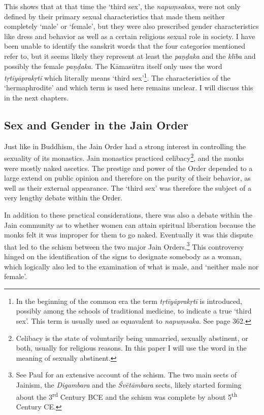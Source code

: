 This shows that at that time the `third sex', the {\em napuṃsakas}, were not only defined by their primary sexual characteristics that made them neither completely `male' or `female', but they were also prescribed gender characteristics like dress and behavior as well as a certain religious sexual role in society. I have been unable to identify the sanskrit words that the four categories mentioned refer to, but it seems likely they represent at least the {\em paṇḍaka} and the {\em klība} and possibly the female {\em paṇḍaka}. The Kāmasūtra itself only uses the word {\em tṛtīyāprakṛtī} which literally means `third sex'\footnote{In the beginning of the common era the term {\em tṛtīyāprakṛtī} is introduced, possibly among the schools of traditional medicine, to indicate a true `third sex'. This term is usually used as equavalent to {\em napuṃsaka}. See \cite{zwilling} page 362.}. The characteristics of the `hermaphrodite' and which term is used here remains unclear. I will discuss this in the next chapters.

\subsection{Sex and Gender in the Jain Order}
Just like in Buddhism, the Jain Order had a strong interest in controlling the sexuality of its monastics. Jain monastics practiced celibacy\footnote{Celibacy is the state of voluntarily being unmarried, sexually abstinent, or both, usually for religious reasons. In this paper I will use the word in the meaning of sexually abstinent.}, and the monks were mostly naked ascetics. The prestige and power of the Order depended to a large extend on public opinion and therefore on the purity of their behavior, as well as their external appearance. The `third sex' was therefore the subject of a very lengthy debate within the Order. 

In addition to these practical considerations, there was also a debate within the Jain community as to whether women can attain spiritual liberation because the monks felt it was improper for them to go naked. Eventually it was this dispute that led to the schism between the two major Jain Orders.\footnote{See Paul \cite{dudas} for an extensive account of the schism. The two main sects of Jainism, the {\em Digambara} and the {\em Śvētāmbara} sects, likely started forming about the 3\textsuperscript{rd} Century BCE and the schism was complete by about 5\textsuperscript{th} Century CE.} This controversy hinged on the identification of the signs to designate somebody as a woman, which logically also led to the examination of what is male, and `neither male nor female'. 

